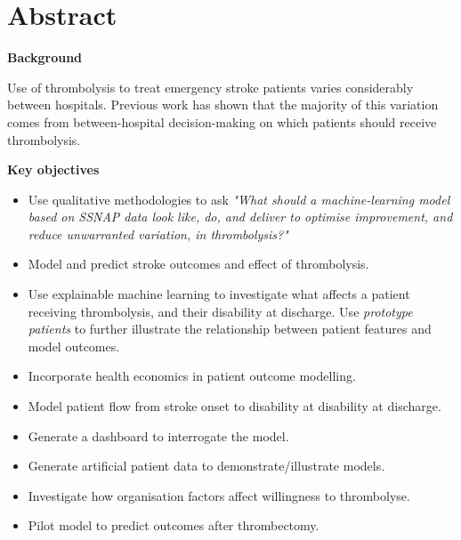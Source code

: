 \section*{Abstract} %

\textbf{Background}

Use of thrombolysis to treat emergency stroke patients varies considerably between hospitals. Previous work has shown that the majority of this variation comes from between-hospital decision-making on which patients should receive thrombolysis.

\textbf{Key objectives} %

\begin{itemize}

    \item Use qualitative methodologies to ask \textit{"What should a machine-learning model based on SSNAP data look like, do, and deliver to optimise improvement, and reduce unwarranted variation, in thrombolysis?"}

    \item Model and predict stroke outcomes and effect of thrombolysis.

    \item Use explainable machine learning to investigate what affects a patient receiving thrombolysis, and their disability at discharge. Use \textit{prototype patients} to further illustrate the relationship between patient features and model outcomes.
    
    \item Incorporate health economics in patient outcome modelling.

    \item Model patient flow from stroke onset to disability at disability at discharge.

    \item Generate a dashboard to interrogate the model.

    \item Generate artificial patient data to demonstrate/illustrate models.

    \item Investigate how organisation factors affect willingness to thrombolyse.
    
    \item Pilot model to predict outcomes after thrombectomy.   

\end{itemize}


